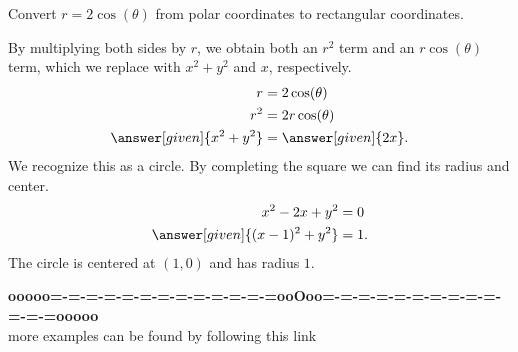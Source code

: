 \documentclass{ximera}
\begin{document}
\begin{example}
   Convert $r =2\cos(\theta)$ from polar coordinates to rectangular
   coordinates.        	
   \begin{explanation}
     By multiplying both sides by $r$, we obtain both an $r^2$ term
     and an $r\cos(\theta)$ term, which we replace with $x^2+y^2$ and
     $x$, respectively.
     \begin{align*}
       r &=2\cos(\theta) \\
       r^2 &= 2r\cos(\theta) \\
       \answer[given]{x^2+y^2} &= \answer[given]{2x}. 
     \end{align*}
     We recognize this as a circle. By completing the square we can
     find its radius and center.
     \begin{align*}
       x^2-2x+y^2 &= 0 \\
       \answer[given]{(x-1)^2 + y^2} &=1.
     \end{align*}
     The circle is centered at $(1,0)$ and has radius $1$.
   \end{explanation}
 \end{example}
















\begin{center}
\textbf{\textcolor{green!50!black}{ooooo=-=-=-=-=-=-=-=-=-=-=-=-=ooOoo=-=-=-=-=-=-=-=-=-=-=-=-=ooooo}} \\

more examples can be found by following this link\\ 

\end{center}
\end{document}
